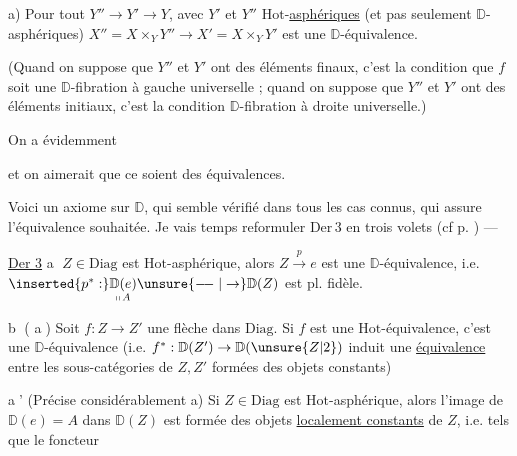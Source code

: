 a) Pour tout $Y''\to Y'\to Y$, avec $Y'$ et $Y''$ $\mathrm{Hot}$-\uline{asphériques} (et pas seulement $\mathbb D$-asphériques) $X''=X\times_Y Y''\longrightarrow X'=X\times_Y Y'$ est une $\mathbb D$-équivalence.

(Quand on suppose que $Y''$ et $Y'$ ont des éléments finaux, c'est la condition que $f$ soit une $\mathbb D$-fibration à gauche universelle ; quand on suppose que $Y''$ et $Y'$ ont des éléments initiaux, c'est la condition $\mathbb D$-fibration à droite universelle.)


On a évidemment


et on aimerait que ce soient des équivalences.

Voici un axiome  sur $\mathbb D$, qui  semble vérifié dans tous les cas connus, qui assure l'équivalence souhaitée. Je vais   temps reformuler $\mathrm{Der}\,3$ en trois volets (cf p. ) ---



\uline{Der 3} \textcircled{\scriptsize a}  $Z\in\mathrm{Diag}$ est $\mathrm{Hot}$-asphérique, alors $Z\xrightarrow{p}e$ est une $\mathbb D$-équivalence, i.e. $\inserted{p^*:}\underset{\shortparallel\, A}{\mathbb D(e)}\unsure{\relbar\joinrel\relbar|\to}\mathbb D(Z)$ est pl. fidèle.

\textcircled{\scriptsize b} ( \textcircled{\scriptsize a}) Soit $f:Z\to Z'$ une flèche dans $\mathrm{Diag}$. Si $f$ est une $\mathrm{Hot}$-équivalence, c'est une $\mathbb D$-équivalence (i.e. $f^*:\mathbb D(Z')\to\mathbb D(\unsure{Z|2})$ induit une \uline{équivalence} entre les sous-catégories de $Z,Z'$ formées des objets constants)

\textcircled{\scriptsize a'} (Précise considérablement a) Si $Z\in\mathrm{Diag}$ est $\mathrm{Hot}$-asphérique, alors  l'image  de $\mathbb D(e)=A$ dans $\mathbb D(Z)$ est formée des objets \uline{localement constants} de $Z$, i.e.  tels que le foncteur

